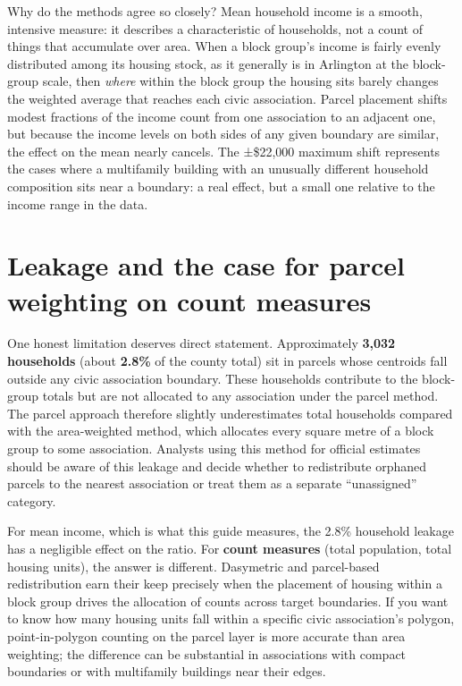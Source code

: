 \documentclass[
  letterpaper,
  DIV=11,
  numbers=noendperiod]{scrreprt}
\begin{document}
Why do the methods agree so closely? Mean household income is a smooth,
intensive measure: it describes a characteristic of households, not a
count of things that accumulate over area. When a block group's income
is fairly evenly distributed among its housing stock, as it generally is
in Arlington at the block-group scale, then \emph{where} within the
block group the housing sits barely changes the weighted average that
reaches each civic association. Parcel placement shifts modest fractions
of the income count from one association to an adjacent one, but because
the income levels on both sides of any given boundary are similar, the
effect on the mean nearly cancels. The ±\$22,000 maximum shift
represents the cases where a multifamily building with an unusually
different household composition sits near a boundary: a real effect, but
a small one relative to the income range in the data.

\section{Leakage and the case for parcel weighting on count
measures}\label{leakage-and-the-case-for-parcel-weighting-on-count-measures}

One honest limitation deserves direct statement. Approximately
\textbf{3,032 households} (about \textbf{2.8\%} of the county total) sit
in parcels whose centroids fall outside any civic association boundary.
These households contribute to the block-group totals but are not
allocated to any association under the parcel method. The parcel
approach therefore slightly underestimates total households compared
with the area-weighted method, which allocates every square metre of a
block group to some association. Analysts using this method for official
estimates should be aware of this leakage and decide whether to
redistribute orphaned parcels to the nearest association or treat them
as a separate ``unassigned'' category.

For mean income, which is what this guide measures, the 2.8\% household
leakage has a negligible effect on the ratio. For \textbf{count
measures} (total population, total housing units), the answer is
different. Dasymetric and parcel-based redistribution earn their keep
precisely when the placement of housing within a block group drives the
allocation of counts across target boundaries. If you want to know how
many housing units fall within a specific civic association's polygon,
point-in-polygon counting on the parcel layer is more accurate than area
weighting; the difference can be substantial in associations with
compact boundaries or with multifamily buildings near their edges.
\end{document}
